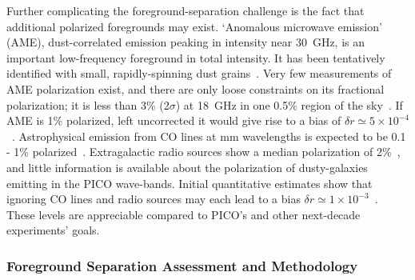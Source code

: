 \documentclass[PICOReport.tex]{subfiles}
\begin{document}

Further complicating the foreground-separation challenge is the fact that additional polarized foregrounds may exist.  
`Anomalous microwave emission' (AME), dust-correlated emission peaking in intensity near 30~GHz, is an important low-frequency foreground in total intensity. 
It has been tentatively identified with small, rapidly-spinning dust grains~\citep{dickinson/etal:2018}. Very few measurements of AME polarization exist, and there are only loose constraints on its fractional polarization; it is less than 3\% (2$\sigma$) at 18~GHz in one 0.5\% region of the sky~\citep{genova_santos:2015}.  If AME is 1\% polarized, left uncorrected it would give rise to a bias of $\delta r \simeq 5\times10^{-4}$~\citep{remazeilles2016}.  Astrophysical emission from CO lines at mm wavelengths is expected to be 0.1 - 1\% polarized~\citep{greeves1999, puglisi2017}.  Extragalactic radio sources show a median polarization of 2\%~\citep{Bonavera2018, puglisi2018_polsource, trombetti2018_fracpol}, and little information is available about the polarization of dusty-galaxies emitting in the PICO wave-bands. Initial quantitative estimates show that ignoring CO lines and radio sources may each lead to a bias $\delta r \simeq 1\times10^{-3}$~\citep{toffolatti2012,remazeilles2018}. These levels are appreciable compared to PICO's and other next-decade experiments' goals. 

\subsubsection{Foreground Separation Assessment and Methodology}
\label{sec:foreground_separation_methodology}
\end{document}
